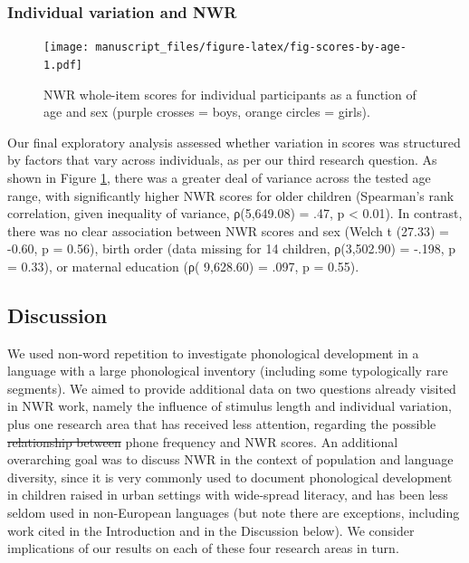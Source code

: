\documentclass[ %
american, %
,man,floatsintext]{apa6} %
\providecommand{\DIFaddtex}[1]{{\protect\color{blue}\uwave{#1}}} %
\providecommand{\DIFdeltex}[1]{{\protect\color{red}\sout{#1}}}                      %
\providecommand{\DIFaddbegin}{} %
\providecommand{\DIFaddend}{} %
\providecommand{\DIFdelbegin}{} %
\providecommand{\DIFdelend}{} %
\providecommand{\DIFadd}[1]{\texorpdfstring{\DIFaddtex{#1}}{#1}} %
\providecommand{\DIFdel}[1]{\texorpdfstring{\DIFdeltex{#1}}{}} %
\newcommand{\DIFscaledelfig}{0.5}
\newlength{\DIFdelgraphicswidth} %
\newlength{\DIFdelgraphicsheight} %
\newcommand{\DIFaddincludegraphics}[2][]{{\color{blue}\fbox{\DIFOincludegraphics[#1]{#2}}}} %
\newcommand{\DIFdelincludegraphics}[2][]{%
	\sbox{\DIFdelgraphicsbox}{\DIFOincludegraphics[#1]{#2}}%
	\settoboxwidth{\DIFdelgraphicswidth}{\DIFdelgraphicsbox} %
	\settoboxtotalheight{\DIFdelgraphicsheight}{\DIFdelgraphicsbox} %
	\scalebox{\DIFscaledelfig}{%
		\parbox[b]{\DIFdelgraphicswidth}{\usebox{\DIFdelgraphicsbox}\\[-\baselineskip] \rule{\DIFdelgraphicswidth}{0em}}\llap{\resizebox{\DIFdelgraphicswidth}{\DIFdelgraphicsheight}{%
				\setlength{\unitlength}{\DIFdelgraphicswidth}%
				\begin{picture}(1,1)%
				\thicklines\linethickness{2pt} %
				{\color[rgb]{1,0,0}\put(0,0){\framebox(1,1){}}}%
				{\color[rgb]{1,0,0}\put(0,0){\line( 1,1){1}}}%
				{\color[rgb]{1,0,0}\put(0,1){\line(1,-1){1}}}%
				\end{picture}%
			}\hspace*{3pt}}} %
} %
\DeclareRobustCommand{\DIFaddbegin}{\DIFOaddbegin \let\includegraphics\DIFaddincludegraphics} %
\DeclareRobustCommand{\DIFaddend}{\DIFOaddend \let\includegraphics\DIFOincludegraphics} %
\DeclareRobustCommand{\DIFdelbegin}{\DIFOdelbegin \let\includegraphics\DIFdelincludegraphics} %
\DeclareRobustCommand{\DIFdelend}{\DIFOaddend \let\includegraphics\DIFOincludegraphics} %
\begin{document}
\DIFdelbegin %
\DIFdelend \DIFaddbegin \hypertarget{individual-variation-and-nwr}{%
	\subsubsection{Individual variation and NWR}\label{individual-variation-and-nwr}}
\DIFaddend 

\begin{figure}
	\centering
	\texttt{[image: manuscript\_files/figure-latex/fig-scores-by-age-1.pdf]}
	\caption{\label{fig:fig-scores-by-age}NWR whole-item scores for individual participants as a function of age and sex (purple crosses = boys, orange circles = girls).}
\end{figure}

Our final exploratory analysis assessed whether variation in scores was structured by factors that vary across individuals, as per our third research question. As shown in Figure \ref{fig:fig-scores-by-age}, there was a greater deal of variance across the tested age range, with significantly higher NWR scores for older children (Spearman's rank correlation, given inequality of variance, ρ(5,649.08) = .47, p \textless{} 0.01). In contrast, there was no clear association between NWR scores and sex (Welch t (27.33) = -0.60, p = 0.56), birth order (data missing for 14 children, ρ(3,502.90) = -.198, p = 0.33), or maternal education (ρ( 9,628.60) = .097, p = 0.55).

\hypertarget{discussion}{%
	\subsection{Discussion}\label{discussion}}

We used non-word repetition to investigate phonological development in a language with a large phonological inventory (including some typologically rare segments). We aimed to provide additional data on two questions already visited in NWR work, namely the influence of stimulus length and individual variation, plus one research area that has received less attention, regarding the possible \DIFdelbegin \DIFdel{relationship between }\DIFdelend \DIFaddbegin \DIFadd{correlation between typological }\DIFaddend phone frequency and NWR scores. An additional overarching goal was to discuss NWR in the context of population and language diversity, since it is very commonly used to document phonological development in children raised in urban settings with wide-spread literacy, and has been less seldom used in non-European languages (but note there are exceptions, including work cited in the Introduction and in the Discussion below). We consider implications of our results on each of these four research areas in turn.
\end{document}
